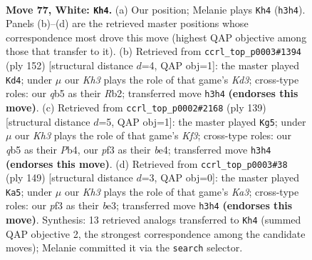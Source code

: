 \documentclass[11pt]{article}
\begin{document}
\clearpage

\begin{figure}[p]\centering
\begin{subfigure}{0.46\textwidth}\centering
\resizebox{\linewidth}{!}{%
\newchessgame
\chessboard[
  setfen={8/2k3b1/8/1q6/8/5p1K/8/8 w - - 0 77},
  showmover=false,
  pgfstyle=straightmove, color=movearrow, markmove={h3-h4}
]}
\caption{}
\end{subfigure}\hfill
\begin{subfigure}{0.46\textwidth}\centering
\resizebox{\linewidth}{!}{%
\newchessgame
\chessboard[
  setfen={8/8/3k4/5p2/8/3K4/1R6/8 w - - 1 77},
  showmover=false,
  pgfstyle=straightmove, color=movearrow, markmove={d3-d4}
]}
\caption{}
\end{subfigure}
\\[4pt]
\begin{subfigure}{0.46\textwidth}\centering
\resizebox{\linewidth}{!}{%
\newchessgame
\chessboard[
  setfen={8/8/5k2/8/1p2B3/1P6/4K3/2b5 b - - 3 70},
  showmover=false,
  pgfstyle=straightmove, color=movearrow, markmove={f6-g5}
]}
\caption{}
\end{subfigure}\hfill
\begin{subfigure}{0.46\textwidth}\centering
\resizebox{\linewidth}{!}{%
\newchessgame
\chessboard[
  setfen={8/6K1/k7/8/8/4B3/8/1Q6 b - - 0 75},
  showmover=false,
  pgfstyle=straightmove, color=movearrow, markmove={a6-a5}
]}
\caption{}
\end{subfigure}
\caption{\textbf{Move 77, White: \texttt{Kh4}.} (a) Our position; Melanie plays \texttt{Kh4} (\texttt{h3h4}). Panels (b)--(d) are the retrieved master positions whose correspondence most drove this move (highest QAP objective among those that transfer to it). (b) Retrieved from \texttt{ccrl\_top\_p0003\#1394} (ply 152) [structural distance $d$=4, QAP obj=1]: the master played \texttt{Kd4}; under $\mu$ our \emph{Kh3} plays the role of that game's \emph{Kd3}; cross-type roles: our \emph{q}b5 as their \emph{R}b2; transferred move \texttt{h3h4} \textbf{(endorses this move)}. (c) Retrieved from \texttt{ccrl\_top\_p0002\#2168} (ply 139) [structural distance $d$=5, QAP obj=1]: the master played \texttt{Kg5}; under $\mu$ our \emph{Kh3} plays the role of that game's \emph{Kf3}; cross-type roles: our \emph{q}b5 as their \emph{P}b4, our \emph{p}f3 as their \emph{b}e4; transferred move \texttt{h3h4} \textbf{(endorses this move)}. (d) Retrieved from \texttt{ccrl\_top\_p0003\#38} (ply 149) [structural distance $d$=3, QAP obj=0]: the master played \texttt{Ka5}; under $\mu$ our \emph{Kh3} plays the role of that game's \emph{Ka3}; cross-type roles: our \emph{p}f3 as their \emph{b}e3; transferred move \texttt{h3h4} \textbf{(endorses this move)}. Synthesis: 13 retrieved analogs transferred to \texttt{Kh4} (summed QAP objective 2, the strongest correspondence among the candidate moves); Melanie committed it via the \texttt{search} selector.}
\label{fig:thought-m152}
\end{figure}
\end{document}

